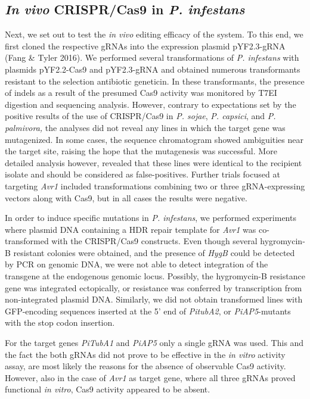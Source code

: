\documentclass[onecolumn, 11pt,openany]{memoir}
\begin{document}
\begin{multicols}{2}
\subsection{\textit{In vivo} CRISPR/Cas9 in \textit{P. infestans}}
Next, we set out to test the \textit{in vivo }editing efficacy of the system. To this end, we first cloned the respective gRNAs into the expression plasmid pYF2.3-gRNA (Fang \& Tyler 2016). We performed several transformations of \textit{P. infestans} with plasmids pYF2.2-Cas9 and pYF2.3-gRNA and obtained numerous transformants resistant to the selection antibiotic geneticin. In these transformants, the presence of indels as a result of the presumed Cas9 activity was monitored by T7EI digestion and sequencing analysis. However, contrary to expectations set by the positive results of the use of CRISPR/Cas9 in \textit{P. sojae}, \textit{P. capsici}, and \textit{P. palmivora, }the analyses did not reveal any lines in which the target gene was mutagenized. In some cases, the sequence chromatogram showed ambiguities near the target site, raising the hope that the mutagenesis was successful. More detailed analysis however, revealed that these lines were identical to the recipient isolate and should be considered as false-positives. Further trials focused at targeting \textit{Avr1 }included transformations combining two or three gRNA-expressing vectors along with Cas9, but in all cases the results were negative. 

In order to induce specific mutations in \textit{P. infestans}, we performed experiments where plasmid DNA containing a HDR repair template for \textit{Avr1 }was co-transformed with the CRISPR/Cas9 constructs. Even though several hygromycin-B resistant colonies were obtained, and the presence of \textit{HygB }could be detected by PCR on genomic DNA, we were not able to detect integration of the transgene at the endogenous genomic locus. Possibly, the hygromycin-B resistance gene was integrated ectopically, or resistance was conferred by transcription from non-integrated plasmid DNA. Similarly, we did not obtain transformed lines with GFP-encoding sequences inserted at the 5' end of \textit{PitubA2}, or \textit{PiAP5}-mutants with the stop codon insertion.

For the target genes \textit{PiTubA1} and \textit{PiAP5 }only a single gRNA was used. This and the fact the both gRNAs did not prove to be effective in the \textit{in vitro} activity assay, are most likely the reasons for the absence of observable Cas9 activity. However, also in the case of \textit{Avr1 }as target gene, where all three gRNAs proved functional \textit{in vitro}, Cas9 activity appeared to be absent.


\end{multicols}
\end{document}
